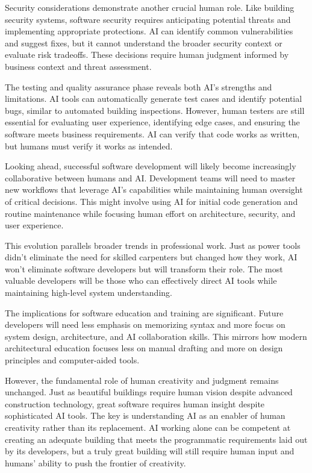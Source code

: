 \documentclass[
  Letterpaper,
]{scrbook}
\begin{document}
Security considerations demonstrate another crucial human role. Like
building security systems, software security requires anticipating
potential threats and implementing appropriate protections. AI can
identify common vulnerabilities and suggest fixes, but it cannot
understand the broader security context or evaluate risk tradeoffs.
These decisions require human judgment informed by business context and
threat assessment.

The testing and quality assurance phase reveals both AI's strengths and
limitations. AI tools can automatically generate test cases and identify
potential bugs, similar to automated building inspections. However,
human testers are still essential for evaluating user experience,
identifying edge cases, and ensuring the software meets business
requirements. AI can verify that code works as written, but humans must
verify it works as intended.

Looking ahead, successful software development will likely become
increasingly collaborative between humans and AI. Development teams will
need to master new workflows that leverage AI's capabilities while
maintaining human oversight of critical decisions. This might involve
using AI for initial code generation and routine maintenance while
focusing human effort on architecture, security, and user experience.

This evolution parallels broader trends in professional work. Just as
power tools didn't eliminate the need for skilled carpenters but changed
how they work, AI won't eliminate software developers but will transform
their role. The most valuable developers will be those who can
effectively direct AI tools while maintaining high-level system
understanding.

The implications for software education and training
are significant. Future developers will need less emphasis on memorizing
syntax and more focus on system design, architecture, and AI
collaboration skills. This mirrors how modern architectural education
focuses less on manual drafting and more on design principles and
computer-aided tools.

However, the fundamental role of human creativity and judgment remains
unchanged. Just as beautiful buildings require human vision despite
advanced construction technology, great software requires human insight
despite sophisticated AI tools. The key is understanding AI as an
enabler of human creativity rather than its replacement. AI working
alone can be competent at creating an adequate building that meets the
programmatic requirements laid out by its developers, but a truly great
building will still require human input and humans' ability to push the
frontier of creativity.
\end{document}
